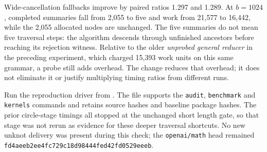Wide-cancellation fallbacks improve by paired ratios 1.297 and 1.289.
At $b=1024$, completed summaries fall from 2,055 to five and work from
21,577 to 16,442, while the 2,055 allocated nodes are unchanged. The five
summaries do not mean five traversal steps: the algorithm descends through
unfinished ancestors before reaching its rejection witness. Relative to
the older \emph{unprobed general reducer} in the preceding experiment,
which charged 15,393 work units on this same grammar, a probe still adds
overhead. The change reduces that overhead; it does not eliminate it or
justify multiplying timing ratios from different runs.



Run the reproduction driver from . The file
 supports the
\texttt{audit}, \texttt{benchmark} and \texttt{kernels} commands and retains
source hashes and baseline package hashes. The prior circle-stage timings
all stopped at the unchanged short
length gate, so that stage was not rerun as evidence for these deeper
traversal shortcuts. No new unknot delivery was present during this check;
the \texttt{openai/math} head remained
\texttt{fd4aeeb2ee4fc729c18d98444fed42fd0529eeeb}.
